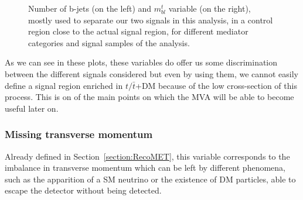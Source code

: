 \documentclass[a4paper, 10pt, openright]{report}
\begin{document}
\begin{figure}[htbp]
\caption{Number of b-jets (on the left) and $m_{bl}^t$ variable (on the right), mostly used to separate our two signals in this analysis, in a control region close to the actual signal region, for different mediator categories and signal samples of the analysis.}
\label{fig:signalsDiscrimination}
\end{figure}

As we can see in these plots, these variables do offer us some discrimination between the different signals considered but even by using them, we cannot easily define a signal region enriched in $t/ \bar t$+DM because of the low cross-section of this process. This is on of the main points on which the \ac{MVA} will be able to become useful later on.

\subsubsection*{Missing transverse momentum}

Already defined in Section~\ref{section:RecoMET}, this variable corresponds to the imbalance in transverse momentum which can be left by different phenomena, such as the apparition of a \ac{SM} neutrino or the existence of \ac{DM} particles, able to escape the detector without being detected.
\end{document}
